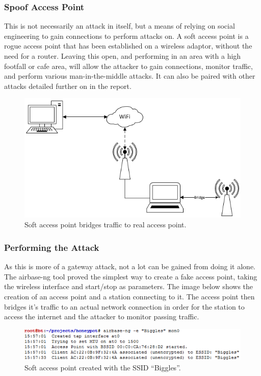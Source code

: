 \subsubsection{Spoof Access Point}
This is not necessarily an attack in itself, but a means of relying on social engineering to gain connections to perform attacks on. A soft access point is a rogue access point that has been established on a wireless adaptor, without the need for a router. Leaving this open, and performing in an area with a high footfall or cafe area, will allow the attacker to gain connections, monitor traffic, and perform various man-in-the-middle attacks. It can also be paired with other attacks detailed further on in the report.

\begin{figure}[h!]
\includegraphics[width=\linewidth]{research/figures/spoofap.png}
\caption{Soft access point bridges traffic to real access point.}
\end{figure}

\subsubsection*{Performing the Attack}
As this is more of a gateway attack, not a lot can be gained from doing it alone. The airbase-ng tool proved the simplest way to create a fake access point, taking the wireless interface and start/stop as parameters. The image below shows the creation of an access point and a station connecting to it. The access point then bridges it’s traffic to an actual network connection in order for the station to access the internet and the attacker to monitor passing traffic.

\begin{figure}[h!]
\includegraphics[width=\linewidth]{research/attackvectors/figures/spoofap1.png}
\caption{Soft access point created with the SSID “Biggles”.}
\end{figure}